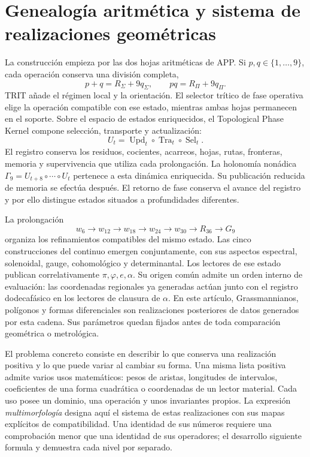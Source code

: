 \documentclass[a4paper,10pt]{article}
\theoremstyle{definition}\newtheorem{definition}[theorem]{Definición}
\theoremstyle{remark}\newtheorem{remark}[theorem]{Observación}
\numberwithin{equation}{section}
\begin{document}
\section{Genealogía aritmética y sistema de realizaciones geométricas}
\label{sec:genealogy}
La construcción empieza por las dos hojas aritméticas de APP. Si
\(p,q\in\{1,\ldots,9\}\), cada operación conserva una división completa,
\[
 p+q=R_\Sigma+9q_\Sigma,\qquad
 pq=R_\Pi+9q_\Pi.
\]
TRIT añade el régimen local y la orientación. El selector trítico de fase
operativa elige la operación compatible con ese estado, mientras ambas hojas
permanecen en el soporte. Sobre el espacio de estados enriquecidos, el
Topological Phase Kernel compone selección, transporte y actualización:
\[
 U_t=\operatorname{Upd}_t\circ\operatorname{Tra}_t\circ\operatorname{Sel}_t.
\]
El registro conserva los residuos, cocientes, acarreos, hojas, rutas,
fronteras, memoria y supervivencia que utiliza cada prolongación. La
holonomía nonádica \(\Gamma_9=U_{t+8}\circ\cdots\circ U_t\) pertenece
a esta dinámica enriquecida. Su publicación reducida de memoria se efectúa
después. El retorno de fase conserva el avance del registro y por ello
distingue estados situados a profundidades diferentes.

La prolongación
\[
 w_6\longrightarrow w_{12}\longrightarrow w_{18}\longrightarrow
 w_{24}\longrightarrow w_{30}\longrightarrow R_{36}\longrightarrow G_9
\]
organiza los refinamientos compatibles del mismo estado. Las cinco
construcciones del continuo emergen conjuntamente, con sus aspectos
espectral, solenoidal, gauge, cohomológico y determinantal. Los lectores
de ese estado publican correlativamente \(\pi,\varphi,e,\alpha\).
Su origen común admite un orden interno de evaluación: las coordenadas
regionales ya generadas actúan junto con el registro dodecafásico en los
lectores de clausura de \(\alpha\). En este artículo, Grassmannianos,
polígonos y formas diferenciales son realizaciones posteriores de datos
generados por esta cadena. Sus parámetros quedan fijados antes de toda
comparación geométrica o metrológica.

El problema concreto consiste en describir lo que conserva una realización
positiva y lo que puede variar al cambiar su forma. Una misma lista positiva
admite varios usos matemáticos: pesos de aristas, longitudes de intervalos,
coeficientes de una forma cuadrática o coordenadas de un lector material.
Cada uso posee un dominio, una operación y unos invariantes propios. La
expresión \emph{multimorfología} designa aquí el sistema de estas realizaciones
con sus mapas explícitos de compatibilidad. Una identidad de sus números
requiere una comprobación menor que una identidad de sus operadores; el
desarrollo siguiente formula y demuestra cada nivel por separado.
\end{document}
